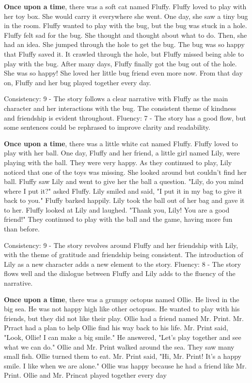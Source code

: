 \documentclass{article}
\begin{document}
\textbf{Once upon a time}, there was a soft cat named Fluffy. Fluffy loved to play with her toy box. She would carry it everywhere she went. One day, she saw a tiny bug in the room. Fluffy wanted to play with the bug, but the bug was stuck in a hole. Fluffy felt sad for the bug. She thought and thought about what to do. Then, she had an idea. She jumped through the hole to get the bug. The bug was so happy that Fluffy saved it. It crawled through the hole, but Fluffy missed being able to play with the bug. After many days, Fluffy finally got the bug out of the hole. She was so happy! She loved her little bug friend even more now. From that day on, Fluffy and her bug played together every day.

Consistency: 9 - The story follows a clear narrative with Fluffy as the main character and her interactions with the bug. The consistent theme of kindness and friendship is evident throughout.
Fluency: 7 - The story has a good flow, but some sentences could be rephrased to improve clarity and readability. 

\textbf{Once upon a time}, there was a little white cat named Fluffy. Fluffy loved to play with her ball. One day, Fluffy and her friend, a little girl named Lily, were playing with the ball. They were very happy. As they continued to play, Lily noticed that one of the toys was missing. She looked around but couldn't find her ball. Fluffy saw Lily and went to give her the ball a question. "Lily, do you mind where I put it?" asked Fluffy. Lily smiled and said, "I put it in my bag to give it back to you." Fluffy barked happily. Lily took the ball out of her bag and gave it to her. Fluffy looked at Lily and laughed. "Thank you, Lily! You are a good friend!" They continued to play with the ball and the game, having more fun than before.

Consistency: 9 - The story revolves around Fluffy and her friendship with Lily, with the theme of gratitude and friendship being consistent. The introduction of Lily as a new character adds a new element to the story.
Fluency: 8 - The story flows well and the dialogue between Fluffy and Lily adds to the fluency of the narrative. 

\textbf{Once upon a time}, there was a grumpy octopus named Ollie. He lived in the big sea. He was not happy high like other octopuss. He wanted to play with his friends, but they did not like their play. Ollie had a friend named Mr. Print. Mr. Prract had a plan to help Ollie find his way back to his life. Mr. Print said, "Look, Ollie! I can make a big smile." He answered, "Let's play together and see what we can do." Ollie and Mr. Print walked around the sea. They saw many small fish. Ollie turned them to eat. Mr. Print said, "Hi, Mr. Print! It's a happy smile. I like when we are alone." Ollie was happy because he had a friend like Mr. Print. Ollie and Mr. Princat played together every day
\end{document}
